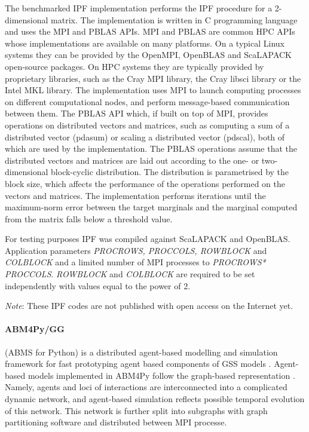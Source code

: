 The benchmarked IPF implementation performs the IPF procedure for a 2-dimensional matrix.
The implementation is written in C programming language and uses the MPI and PBLAS APIs. MPI and PBLAS are common HPC APIs whose implementations are available on many platforms. On a typical Linux systems they can be provided by the OpenMPI, OpenBLAS and \textsf{ScaLAPACK} open-source packages. On HPC systems they are typically provided by proprietary libraries, such as the Cray MPI library, the Cray libsci library or the Intel MKL library.
The implementation uses MPI to launch computing processes on different computational nodes, and perform message-based communication between them. The PBLAS API which, if built on top of MPI, provides operations on distributed vectors and matrices, such as computing a sum of a distributed vector (pdasum) or scaling a distributed vector (pdscal), both of which are used by the implementation.
The PBLAS operations assume that the distributed vectors and matrices are laid out according to the one- or two-dimensional block-cyclic distribution. The distribution is parametrised by the block size, which affects the performance of the operations performed on the vectors and matrices.
The implementation performs iterations until the maximum-norm error between the target marginals and the marginal computed from the matrix falls below a threshold value.

For testing purposes IPF was compiled against \textsf{ScaLAPACK} and OpenBLAS. 
Application parameters \textit{PROCROWS, PROCCOLS, ROWBLOCK} and \textit{COLBLOCK}  and a limited number of MPI processes to \textit{PROCROWS* PROCCOLS}. \textit{ROWBLOCK} and \textit{COLBLOCK} are required to be set independently with values equal to the power of 2.

\fi

\textit{Note}: These IPF codes are not published with open access on the Internet yet.

\paragraph{ABM4Py/GG} (ABMS for Python) is a distributed agent-based modelling and simulation framework for fast prototyping agent based components of GSS models \cite{2018:abm4py}.
Agent-based models implemented in \textsf{ABM4Py} follow the graph-based representation \cite{2018:abm4py,2017:graph_abms}.
Namely, agents and loci of interactions are interconnected into a complicated dynamic network, and agent-based simulation reflects possible temporal evolution of this network.
This network is further split into subgraphs with graph partitioning software and distributed between MPI processe.

